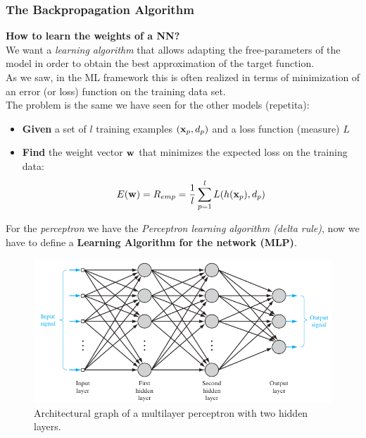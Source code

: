 \documentclass[../main.tex]{subfiles}
\begin{document}
\subsubsection{The Backpropagation Algorithm}
\textbf{How to learn the weights of a NN?}\\
We want a \emph{learning algorithm} that allows adapting the free-parameters of the model in order to obtain the best approximation of the target function.\\
As we saw, in the ML framework this is often realized in terms of minimization of an error (or loss) function on the training data set.\\

\noindent The problem is the same we have seen for the other models (repetita):
\begin{itemize}
    \item \textbf{Given} a set of $l$ training examples $(\bold{x}_p,d_p)$ and a loss function (measure) $L$
    \item \textbf{Find} the weight vector $\bold{w}$ that minimizes  the expected loss on the training data:
    $$E(\bold{w}) = R_{emp} = \frac{1}{l}\sum_{p=1}^{l}L(h(\bold{x}_p),d_p)$$
\end{itemize}
For the \emph{perceptron} we have the \emph{Perceptron learning algorithm (delta rule)}, now we have to define a \textbf{Learning Algorithm for the network (MLP)}.
\begin{figure}[H]
    \centering
    \includegraphics[scale = 0.45]{lectures/4_neural_networks/4_mlp.png}
    \caption{Architectural graph of a multilayer perceptron with two hidden layers.}
    \label{fig:4_mlp}
\end{figure}
\end{document}
